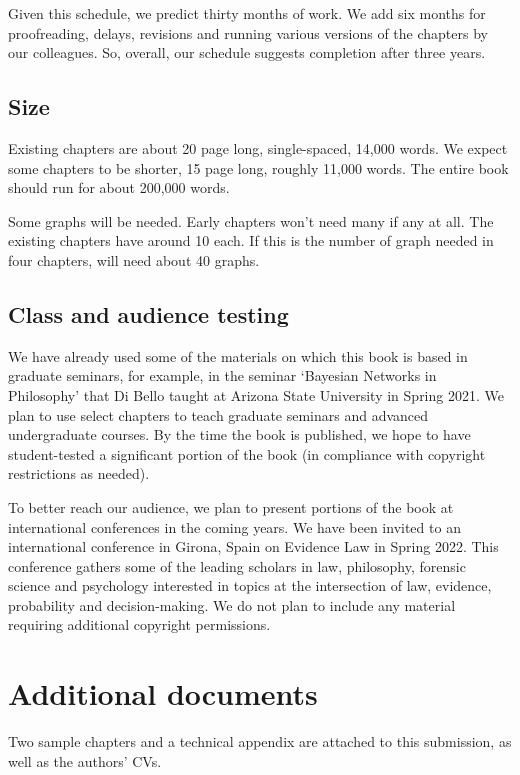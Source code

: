 \documentclass[
  10pt,
  dvipsnames,enabledeprecatedfontcommands]{scrartcl}
\begin{document}
Given this schedule, we predict thirty months of work. We add six months
for proofreading, delays, revisions and running various versions of the
chapters by our colleagues. So, overall, our schedule suggests
completion after three years.

\hypertarget{size}{%
\subsection{Size}\label{size}}

Existing chapters are about 20 page long, single-spaced, 14,000 words.
We expect some chapters to be shorter, 15 page long, roughly 11,000
words. The entire book should run for about 200,000 words.

Some graphs will be needed. Early chapters won't need many if any at
all. The existing chapters have around 10 each. If this is the number of
graph needed in four chapters, will need about 40 graphs.

\hypertarget{class-and-audience-testing}{%
\subsection{Class and audience
testing}\label{class-and-audience-testing}}

We have already used some of the materials on which this book is based
in graduate seminars, for example, in the seminar `Bayesian Networks in
Philosophy' that Di Bello taught at Arizona State University in Spring
2021. We plan to use select chapters to teach graduate seminars and
advanced undergraduate courses. By the time the book is published, we
hope to have student-tested a significant portion of the book (in
compliance with copyright restrictions as needed).

To better reach our audience, we plan to present portions of the book at
international conferences in the coming years. We have been invited to
an international conference in Girona, Spain on Evidence Law in Spring
2022. This conference gathers some of the leading scholars in law,
philosophy, forensic science and psychology interested in topics at the
intersection of law, evidence, probability and decision-making. We do
not plan to include any material requiring additional copyright
permissions.

\hypertarget{additional-documents}{%
\section{Additional documents}\label{additional-documents}}

Two sample chapters and a technical appendix are attached to this
submission, as well as the authors' CVs.
\end{document}
